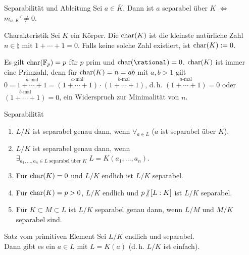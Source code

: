 \begin{Lemma}{Separabilität und Ableitung}
    Sei $a \in \overline{K}$.
    Dann ist $a$ separabel über $K$ $\iff$ $m_{a,K}' \not= 0$.
\end{Lemma}

\begin{Def}{Charakteristik}
    Sei $K$ ein Körper.
    Die  $\operatorname{char}(K)$ ist die kleinste natürliche
    Zahl $n \in \natural$ mit $1 + \dotsb + 1 = 0$.
    Falls keine solche Zahl existiert, ist $\operatorname{char}(K) := 0$.
\end{Def}

\begin{Bsp}
    Es gilt $\operatorname{char}(\mathbb{F}_p) = p$ für $p$ prim und
    $\Char(\rational) = 0$.
    $\operatorname{char}(K)$ ist immer eine Primzahl, denn für $\operatorname{char}(K) = n = ab$ mit
    $a, b > 1$ gilt $0 = \overset{n\text{-mal}}{1 + \dotsb + 1} =
    \overset{a\text{-mal}}{(1 + \dotsb + 1)} \cdot
    \overset{b\text{-mal}}{(1 + \dotsb + 1)}$, d.\,h.
    $\overset{a\text{-mal}}{(1 + \dotsb + 1)} = 0$ oder
    $\overset{b\text{-mal}}{(1 + \dotsb + 1)} = 0$, ein Widerspruch zur
    Minimalität von $n$.
\end{Bsp}

\begin{Prop}{Separabilität}
    \begin{enumerate}[label=(\alph*)]
        \item
        $L/K$ ist separabel genau dann, wenn
        $\forall_{a \in L}$ ($a$ ist separabel über $K$).

        \item
        $L/K$ ist separabel genau dann, wenn
        $\exists_{a_1, \dotsc, a_n \in L \text{ separabel über } K}\;
        L = K(a_1, \dotsc, a_n)$.

        \item
        Für $\operatorname{char}(K) = 0$ und $L/K$ endlich ist $L/K$ separabel.

        \item
        Für $\operatorname{char}(K) = p > 0$, $L/K$ endlich und $p \mathbin{\!\not|} [L:K]$ ist
        $L/K$ separabel.

        \item
        Für $K \subset M \subset L$
        ist $L/K$ separabel genau dann, wenn
        $L/M$ und $M/K$ separabel sind.
    \end{enumerate}
\end{Prop}

\begin{Theorem}{Satz vom primitiven Element}
    Sei $L/K$ endlich und separabel.\\
    Dann gibt es ein $a \in L$ mit $L = K(a)$
    (d.\,h. $L/K$ ist einfach).
\end{Theorem}


